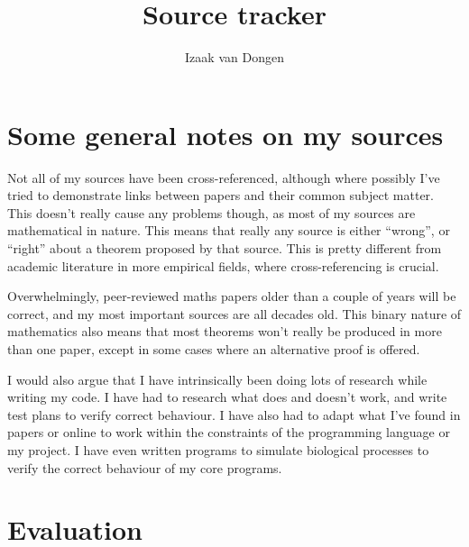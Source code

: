 \documentclass{article}
\title{Source tracker}
\author{Izaak van Dongen}
\begin{document}
    \maketitle

    \section{Some general notes on my sources} \label{sourcenotes}

    Not all of my sources have been cross-referenced, although where possibly
    I've tried to demonstrate links between papers and their common subject
    matter. This doesn't really cause any problems though, as most of my
    sources are mathematical in nature. This means that really any source is
    either ``wrong'', or ``right'' about a theorem proposed by that source.
    This is pretty different from academic literature in more empirical fields,
    where cross-referencing is crucial.

    Overwhelmingly, peer-reviewed maths papers older than a couple of years will
    be correct, and my most important sources are all decades old. This binary
    nature of mathematics also means that most theorems won't really be produced
    in more than one paper, except in some cases where an alternative proof is
    offered.

    I would also argue that I have intrinsically been doing lots of research
    while writing my code. I have had to research what does and doesn't work,
    and write test plans to verify correct behaviour. I have also had to adapt
    what I've found in papers or online to work within the constraints of the
    programming language or my project. I have even written programs to simulate
    biological processes to verify the correct behaviour of my core programs.

    \section{Evaluation}
\end{document}
